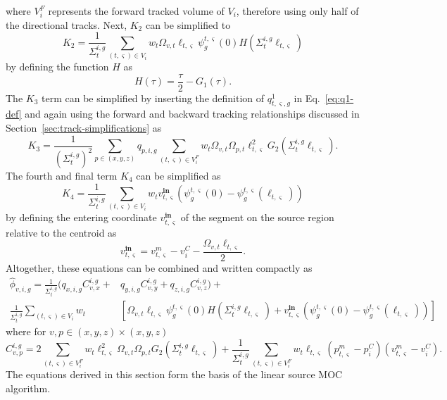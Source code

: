where $V^F_i$ represents the forward tracked volume of $V_i$, therefore using only half of the directional tracks. Next, $K_2$ can be simplified to
\begin{equation}
K_2 = \frac{1}{\Sigma_{t}^{i,g}} \sum_{(t,\varsigma) \in V_i} w_t \Omega_{v,t} \ell_{t,\varsigma} \psi^{t,\varsigma}_g(0) H(\Sigma_{t}^{i,g} \ell_{t,\varsigma})
\end{equation}
by defining the function $H$ as
\begin{equation}
H(\tau) = \frac{\tau}{2} - G_1(\tau).
\label{eq:h}
\end{equation}
The $K_3$ term can be simplified by inserting the definition of $q^1_{t,\varsigma,g}$ in Eq.~\ref{eq:q1-def} and again using the forward and backward tracking relationships discussed in Section~\ref{sec:track-simplifications} as
\begin{equation}
K_3 = \frac{1}{\left(\Sigma_{t}^{i,g}\right)^2} \sum_{p \in (x,y,z)} q_{p,i,g} \sum_{(t,\varsigma) \in V^F_i} w_t \Omega_{v,t} \Omega_{p,t} \ell_{t,\varsigma}^2 G_2(\Sigma_{t}^{i,g} \ell_{t,\varsigma}).
\end{equation}
The fourth and final term $K_4$ can be simplified as
\begin{equation}
K_4 = \frac{1}{\Sigma_{t}^{i,g}} \sum_{(t,\varsigma) \in V_i} w_t v^{\textbf{in}}_{t,\varsigma} \left(\psi^{t,\varsigma}_g(0) - \psi^{t,\varsigma}_g(\ell_{t,\varsigma}) \right)
\end{equation}
by defining the entering coordinate $v^{\textbf{in}}_{t,\varsigma}$ of the segment on the source region relative to the centroid as
\begin{equation}
v^{\textbf{in}}_{t,\varsigma} = v^m_{t,\varsigma} - v^C_i - \frac{\Omega_{v,t} \ell_{t,\varsigma}}{2}.
\end{equation}
Altogether, these equations can be combined and written compactly as
\begin{equation}
\begin{split}
\hat{\phi}_{v,i,g} = \frac{1}{\Sigma_{t}^{i,g}} \Bigg( q_{x,i,g} C_{v,x}^{i,g} + & q_{y,i,g} C_{v,y}^{i,g} + q_{z,i,g} C_{v,z}^{i,g} \Bigg)+  \\
\frac{1}{\Sigma_{t}^{i,g}} \sum_{(t,\varsigma) \in V_i} w_t & \left[\Omega_{v,t} \ell_{t,\varsigma} \psi^{t,\varsigma}_g(0) H(\Sigma_{t}^{i,g} \ell_{t,\varsigma}) + v^{\textbf{in}}_{t,\varsigma} \left(\psi^{t,\varsigma}_g(0) - \psi^{t,\varsigma}_g(\ell_{t,\varsigma}) \right)\right]
\end{split}
\label{eq:final-scalar-flux-moments}
\end{equation}
where for $v, p \in (x,y,z) \times (x,y,z)$
\begin{equation}
C_{v,p}^{i,g} =  2 \sum_{(t,\varsigma) \in V^F_i} w_t \ell_{t,\varsigma}^2 \Omega_{v,t} \Omega_{p,t} G_2(\Sigma_{t}^{i,g} \ell_{t,\varsigma}) + \frac{1}{\Sigma_{t}^{i,g}} \sum_{(t,\varsigma) \in V^F_i} w_t \ell_{t,\varsigma} \left( p^m_{t,\varsigma} - p^C_i \right) \left(v^m_{t,\varsigma} - v^C_i\right).
\label{eq:ls-C}
\end{equation}
The equations derived in this section form the basis of the linear source \ac{MOC} algorithm.

